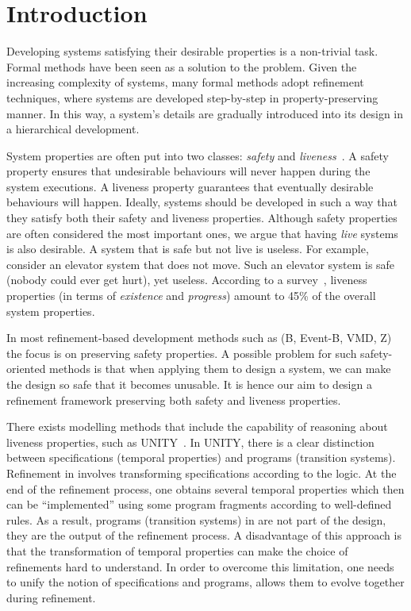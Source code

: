 \section{Introduction}
\label{sec:introduction}

Developing systems satisfying their desirable properties is a
non-trivial task.  Formal methods have been seen as a solution to the
problem.  Given the increasing complexity of systems, many
formal methods adopt refinement techniques, where systems are
developed step-by-step in property-preserving manner.  In this way,
a system's details are gradually introduced into its design in
a hierarchical development.

System properties are often put into two classes: \emph{safety}
and \emph{liveness}~\cite{DBLP:journals/tse/Lamport77}.  A safety
property ensures that undesirable behaviours will never happen
during the system executions.  A liveness property guarantees that
eventually desirable behaviours will happen.  Ideally, systems should
be developed in such a way that they satisfy both their safety and liveness
properties.  Although safety properties are often considered the most
important ones, we argue that having \emph{live} systems is also desirable.
A system that is safe but not live is useless.  For example, consider
an elevator system that does not move. Such an elevator system is safe
(nobody could ever get hurt), yet useless.  According to a
survey~\cite{DBLP:conf/icse/DwyerAC99}, liveness properties (in terms
of \emph{existence} and \emph{progress}) amount to 45\% of the overall
system properties.

In most refinement-based development methods such as (B, Event-B, VMD,
Z) the focus is on preserving safety properties.  A possible problem
for such safety-oriented methods is that when applying them to design a
system, we can make the design so safe that it becomes unusable.  It is
hence our aim to design a refinement framework preserving both safety
and liveness properties.

There exists modelling methods that include the capability of reasoning
about liveness properties, such as
UNITY~\cite{DBLP:books/daglib/0067338}.  In UNITY, there is a clear
distinction between specifications (temporal properties) and programs
(transition systems).  Refinement in \unity involves transforming
specifications according to the \unity logic.  At the end of the
refinement process, one obtains several temporal properties which then
can be ``implemented'' using some program fragments according to
well-defined rules.  As a result, programs (transition systems) in
\unity are not part of the design, they are the output of the
refinement process.  A disadvantage of this approach is that the
transformation of temporal properties can make the
choice of refinements hard to understand.  In order to overcome 
this limitation, one needs to unify the notion of specifications and 
programs, allows them to evolve together during refinement.

